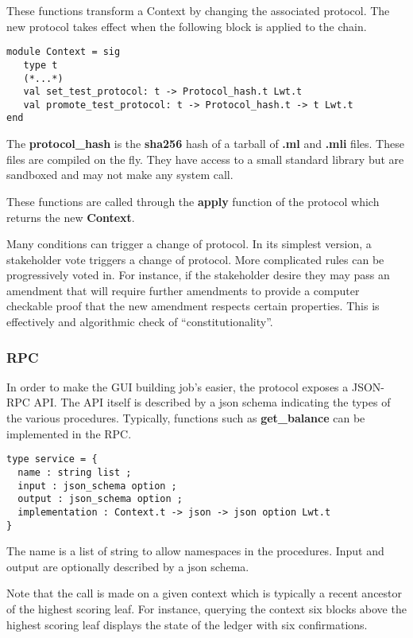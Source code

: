 \documentclass[letterpaper]{article}
\begin{document}
These functions transform a Context by changing the associated protocol.
The new protocol takes effect when the following block is applied to the chain.

\begin{lstlisting}
module Context = sig
   type t
   (*...*)
   val set_test_protocol: t -> Protocol_hash.t Lwt.t
   val promote_test_protocol: t -> Protocol_hash.t -> t Lwt.t
end
\end{lstlisting}

The \textbf{protocol\_hash} is the \textbf{sha256} hash of a tarball of
\textbf{.ml} and \textbf{.mli} files. These files are compiled on the
fly. They have access to a small standard library but are sandboxed
and may not make any system call.

These functions are called through the \textbf{apply} function of the protocol
which returns the new \textbf{Context}.

Many conditions can trigger a change of protocol. In its simplest version,
a stakeholder vote triggers a change of protocol. More complicated rules
can be progressively voted in. For instance, if the stakeholder desire they
may pass an amendment that will require further amendments to provide a
computer checkable proof that the new amendment respects certain properties.
This is effectively and algorithmic check of ``constitutionality''.

\subsubsection{RPC}
In order to make the GUI building job's easier, the protocol exposes a JSON-RPC
API. The API itself is described by a json schema indicating the types of the
various procedures. Typically, functions such as \textbf{get\_balance} can
be implemented in the RPC.

\begin{lstlisting}
type service = {
  name : string list ;
  input : json_schema option ;
  output : json_schema option ;
  implementation : Context.t -> json -> json option Lwt.t
}
\end{lstlisting}

The name is a list of string to allow namespaces in the procedures. Input and
output are optionally described by a json schema.

Note that the call is made on a given context which is typically a recent ancestor
of the highest scoring leaf. For instance, querying the context six blocks above
the highest scoring leaf displays the state of the ledger with six confirmations.
\end{document}
